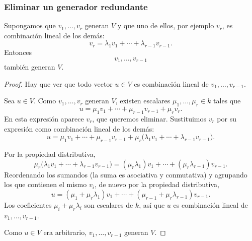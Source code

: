 \begin{frame}[allowframebreaks,t]
    \frametitle{Eliminar un generador redundante}

    \begin{proposition}
        Supongamos que \(v_1,\ldots,v_r\) generan \(V\) y que uno de ellos,
        por ejemplo \(v_r\), es combinación lineal de los demás:
        \[
            v_r=\lambda_1v_1+\cdots+\lambda_{r-1}v_{r-1}.
        \]
        Entonces
        \[
            v_1,\ldots,v_{r-1}
        \]
        también generan \(V\).
    \end{proposition}

    \begin{proof}
        Hay que ver que todo vector \(u\in V\) es combinación lineal de
        \(v_1,\ldots,v_{r-1}\).

        Sea \(u\in V\). Como \(v_1,\ldots,v_r\) generan \(V\), existen
        escalares \(\mu_1,\ldots,\mu_r\in k\) tales que
        \[
            u=\mu_1v_1+\cdots+\mu_{r-1}v_{r-1}+\mu_rv_r.
        \]
        En esta expresión aparece \(v_r\), que queremos eliminar.
        Sustituimos \(v_r\) por su expresión como combinación lineal
        de los demás:
        \[
            u=\mu_1v_1+\cdots+\mu_{r-1}v_{r-1}
            +\mu_r\bigl(\lambda_1v_1+\cdots+\lambda_{r-1}v_{r-1}\bigr).
        \]

        \framebreak

        Por la propiedad distributiva,
        \[
            \mu_r\bigl(\lambda_1v_1+\cdots+\lambda_{r-1}v_{r-1}\bigr)
            =(\mu_r\lambda_1)v_1+\cdots+(\mu_r\lambda_{r-1})v_{r-1}.
        \]
        Reordenando los sumandos (la suma es asociativa y conmutativa)
        y agrupando los que contienen el mismo \(v_i\), de nuevo por la
        propiedad distributiva,
        \[
            u=(\mu_1+\mu_r\lambda_1)v_1+\cdots
            +(\mu_{r-1}+\mu_r\lambda_{r-1})v_{r-1}.
        \]
        Los coeficientes \(\mu_i+\mu_r\lambda_i\) son escalares de \(k\),
        así que \(u\) es combinación lineal de \(v_1,\ldots,v_{r-1}\).

        Como \(u\in V\) era arbitrario, \(v_1,\ldots,v_{r-1}\) generan \(V\).
    \end{proof}
\end{frame}


